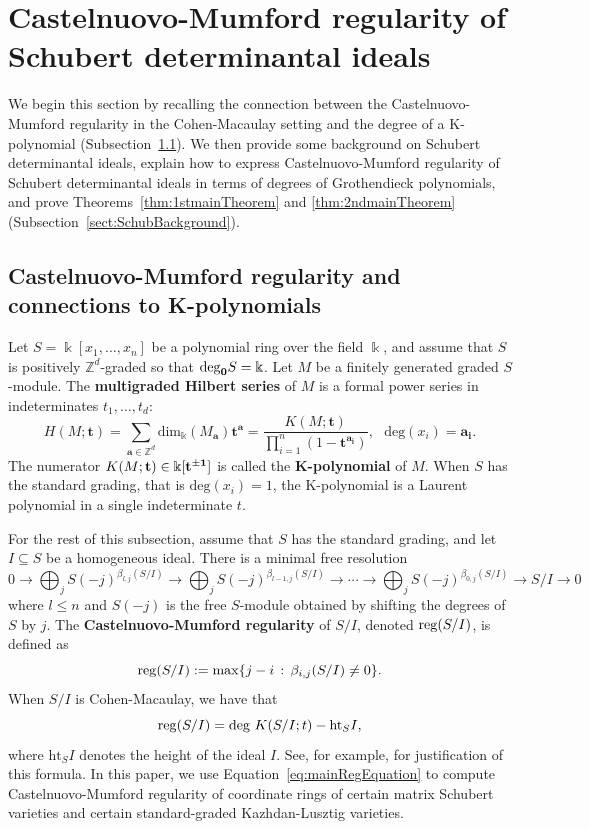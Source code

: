 \documentclass[12pt]{amsart}
\theoremstyle{definition}
\theoremstyle{remark}
\numberwithin{equation}{section}
\newcommand\mydef[1]{{\bf #1}}
\newcommand{\reg}{{\rm reg}}
\begin{document}
 
\section{Castelnuovo-Mumford regularity of Schubert determinantal ideals}
\label{section:CM}
We begin this section by recalling the connection between the Castelnuovo-Mumford regularity in the Cohen-Macaulay setting and the degree of a K-polynomial (Subsection~\ref{sect:CMreg}). We then  provide some background on Schubert determinantal ideals, explain how to  express Castelnuovo-Mumford regularity of Schubert determinantal ideals in terms of degrees of Grothendieck polynomials, and prove Theorems~\ref{thm:1stmainTheorem} and \ref{thm:2ndmainTheorem} (Subsection~\ref{sect:SchubBackground}).




\subsection{Castelnuovo-Mumford regularity and connections to K-polynomials}\label{sect:CMreg}

Let $S = \Bbbk[x_1,\ldots, x_n]$ be a polynomial ring over the field $\Bbbk$, and assume that $S$ is positively $\mathbb{Z}^d$-graded so that ${\rm deg}_{{\mathbf 0}}S = \Bbbk$. 
Let $M$ be a finitely generated graded $S$-module. The \mydef{multigraded Hilbert series} of $M$ is a formal power series in indeterminates $t_1,\dots, t_d$:
\[
H(M; \mathbf{t}) = \sum_{\mathbf{a}\in \mathbb{Z}^d}\text{dim}_{\Bbbk}(M_{\mathbf{a}})\mathbf{t}^{\mathbf{a}}
=\frac{K(M;\mathbf{t})}{\prod_{i=1}^n(1-\mathbf{t}^{\mathbf{a_i}})},~~~\text{deg}(x_i) = \mathbf{a_i}.
\]
The numerator $K(M;\bf{t})\in \Bbbk[\bf{t}^{\pm 1}]$ is called the $\mathbf{K}$\mydef{-polynomial} of $M$. 
When $S$ has the standard grading, that is $\text{deg}(x_i) = 1$, the K-polynomial is a Laurent polynomial in a single indeterminate $t$.

For the rest of this subsection, assume that $S$ has the standard grading, and let $I\subseteq S$ be a homogeneous ideal. 
There is a minimal free resolution 
\[
 0 \rightarrow \bigoplus_jS(-j)^{\beta_{l,j}(S/I)}\rightarrow \bigoplus_jS(-j)^{\beta_{l-1,j}(S/I)}\rightarrow \cdots \rightarrow \bigoplus_jS(-j)^{\beta_{0,j}(S/I)} \rightarrow S/I \rightarrow 0
\]
where $l\leq n$ and $S(-j)$ is the free $S$-module obtained by shifting the degrees of $S$ by $j$. 
The \mydef{Castelnuovo-Mumford regularity} of $S/I$, denoted $\reg(S/I)$, is defined as
\[
\reg(S/I):=\max\{j-i \,:  \, \beta_{i,j}(S/I)\neq 0\}.
\]
When $S/I$ is Cohen-Macaulay, we have that  
\begin{equation}\label{eq:mainRegEquation}
\reg(S/I) = \text{deg }K(S/I;t) - \text{ht}_S I,
\end{equation}
where $\text{ht}_S I$ denotes the height of the ideal $I$. 
See, for example, \cite[Lemma 2.5]{Benedetti.Varbaro} for justification of this formula. 
In this paper, we use Equation~\eqref{eq:mainRegEquation} to compute Castelnuovo-Mumford regularity of coordinate rings of certain matrix Schubert varieties and certain standard-graded Kazhdan-Lusztig varieties. 
\end{document}
